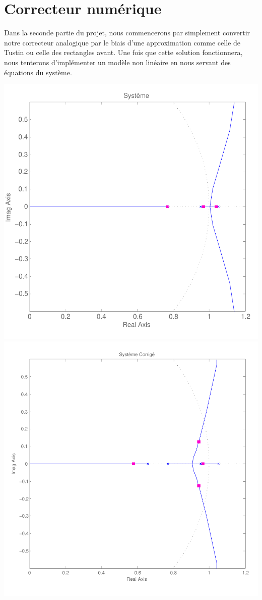 \documentclass[11pt, french]{article} %
\begin{document}
\section{Correcteur numérique}

Dans la seconde partie du projet, nous commencerons par simplement convertir notre correcteur analogique par le biais d'une approximation comme celle de Tustin ou celle des rectangles avant. Une fois que cette solution fonctionnera, nous tenterons d'implémenter un modèle non linéaire en nous servant des équations du système. 

\includegraphics[scale=0.50]{RLN_Sys_Seul.pdf}
\includegraphics[scale=0.50]{RLN_Sys_AvPh_K5.pdf}
\end{document}
